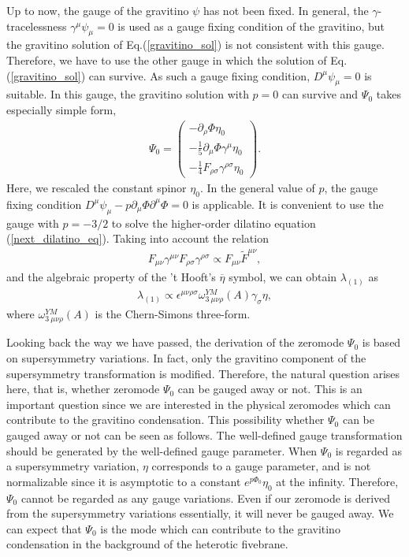 \documentclass[a4paper,aps, amssymb, preprint, 12pt]{revtex4}
\begin{document}
Up to now, the gauge of the gravitino $\psi$ has not been fixed.
In general, the $\gamma$-tracelessness $\gamma^\mu\psi_\mu=0$ is used as a gauge fixing condition of the gravitino, but the gravitino solution of Eq.(\ref{gravitino_sol}) is not consistent with this gauge.
Therefore, we have to use the other gauge in which the solution of Eq.(\ref{gravitino_sol}) can survive.
As such a gauge fixing condition, $D^\mu\psi_\mu=0$ is suitable.
In this gauge, the gravitino solution with $p=0$ can survive and $\Psi_0$ takes especially simple form,
\begin{eqnarray}
\Psi_0 = 
\left(\begin{array}{c}
-\partial_\rho\Phi\eta_0 \\
-\frac{1}{5}\partial_\mu\Phi\gamma^\mu\eta_0 \\
-\frac{1}{4}F_{\rho\sigma}\gamma^{\rho\sigma}\eta_0
\end{array}
\right).
\end{eqnarray}
Here, we rescaled the constant spinor $\eta_0$.
In the general value of $p$, the gauge fixing condition $D^\mu\psi_\mu - p\partial_\mu\Phi\partial^\mu\Phi = 0$ is applicable.
It is convenient to use the gauge with $p=-3/2$ to solve the higher-order dilatino equation (\ref{next_dilatino_eq}).
Taking into account the relation
\begin{eqnarray}
F_{\mu\nu}\gamma^{\mu\nu}F_{\rho\sigma}\gamma^{\rho\sigma} \propto F_{\mu\nu}\tilde{F}^{\mu\nu},
\end{eqnarray}
and the algebraic property of the 't Hooft's $\overline{\eta}$ symbol, we can obtain $\lambda_{(1)}$ as
\begin{eqnarray}
\lambda_{(1)} \propto {\epsilon}^{\mu\nu\rho\sigma}\omega_{3\:\mu\nu\rho}^{YM}(A){\gamma}_{\sigma}\eta,
\end{eqnarray}
where $\omega_{3\:\mu\nu\rho}^{YM}(A)$ is the Chern-Simons three-form.

Looking back the way we have passed, the derivation of the zeromode $\Psi_0$ is based on supersymmetry variations.
In fact, only the gravitino component of the supersymmetry transformation is modified.
Therefore, the natural question arises here, that is, whether zeromode $\Psi_0$ can be gauged away or not.
This is an important question since we are interested in the physical zeromodes which can contribute to the gravitino condensation.
This possibility whether $\Psi_0$ can be gauged away or not can be seen as follows.
The well-defined gauge transformation should be generated by the well-defined gauge parameter.
When $\Psi_0$ is regarded as a supersymmetry variation, $\eta$ corresponds to a gauge parameter, and is not normalizable since it is asymptotic to a constant $e^{p\Phi_0}\eta_0$ at the infinity.
Therefore, $\Psi_0$ cannot be regarded as any gauge variations.
Even if our zeromode is derived from the supersymmetry variations essentially, it will never be gauged away.
We can expect that $\Psi_0$ is the mode which can contribute to the gravitino condensation in the background of the heterotic fivebrane.
\end{document}
